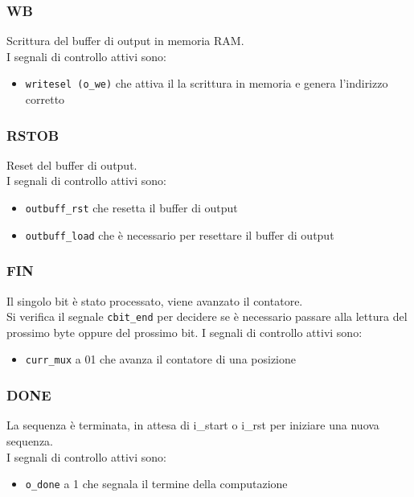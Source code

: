 \documentclass[12pt, a4paper]{article}
\begin{document}
\subsubsection{WB}
Scrittura del buffer di output in memoria RAM.\\
I segnali di controllo attivi sono:
\begin{itemize}
    \item \texttt{writesel (o\_we)} che attiva il la scrittura in memoria e genera l'indirizzo corretto
\end{itemize}

\subsubsection{RSTOB}
Reset del buffer di output.\\
I segnali di controllo attivi sono:
\begin{itemize}
    \item \texttt{outbuff\_rst} che resetta il buffer di output
    \item \texttt{outbuff\_load} che è necessario per resettare il buffer di output
\end{itemize}

\subsubsection{FIN}
Il singolo bit è stato processato, viene avanzato il contatore.\\
Si verifica il segnale \texttt{cbit\_end} per decidere se è necessario passare alla lettura del
prossimo byte oppure del prossimo bit.
I segnali di controllo attivi sono:
\begin{itemize}
    \item \texttt{curr\_mux} a 01 che avanza il contatore di una posizione
\end{itemize}

\subsubsection{DONE}
La sequenza è terminata, in attesa di i\_start o i\_rst per iniziare una nuova sequenza.\\
I segnali di controllo attivi sono:
\begin{itemize}
    \item \texttt{o\_done} a 1 che segnala il termine della computazione
\end{itemize}
\end{document}
